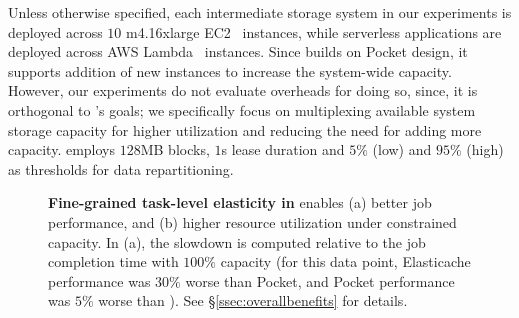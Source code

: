  Unless otherwise specified, each intermediate storage system in our experiments is deployed across $10$ m4.16xlarge EC2~\cite{ec2} instances, while serverless applications are deployed across AWS Lambda~\cite{ec2} instances. Since \jiffy builds on Pocket design, it supports addition of new instances to increase the system-wide capacity. However, our experiments do not evaluate overheads for doing so, since, it is orthogonal to \jiffy's goals; we specifically focus on multiplexing available system storage capacity for higher utilization and reducing the need for adding more capacity. \jiffy employs $128$MB blocks, $1$s lease duration and $5\%$ (low) and $95\%$ (high) as thresholds for data repartitioning. %

\begin{figure}[t]
  \centering
  \vspace{-1em}
  \caption{\textbf{Fine-grained task-level elasticity in \jiffy} enables (a) better job performance, and (b) higher resource utilization under constrained capacity. In (a), the slowdown is computed relative to the job completion time with $100\%$ capacity (for this data point, Elasticache performance was $30\%$ worse than Pocket, and Pocket performance was $5\%$ worse than \jiffy). See \S\ref{ssec:overallbenefits} for details.}
  \label{fig:elasticity}\vspace{-1.25em}
\end{figure}


